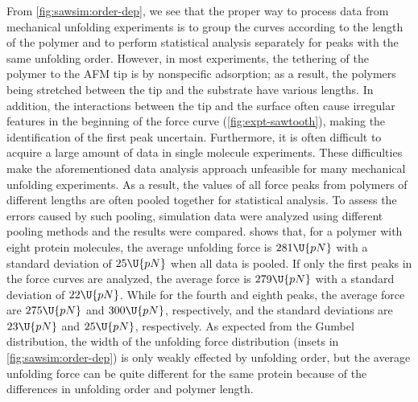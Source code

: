 From \cref{fig:sawsim:order-dep}, we see that the proper way to
process data from mechanical unfolding experiments is to group the
curves according to the length of the polymer and to perform
statistical analysis separately for peaks with the same unfolding
order.  However, in most experiments, the tethering of the polymer to
the AFM tip is by nonspecific adsorption; as a result, the polymers
being stretched between the tip and the substrate have various
lengths\citep{li00}.  In addition, the interactions between the tip
and the surface often cause irregular features in the beginning of the
force curve (\cref{fig:expt-sawtooth}), making the identification of
the first peak uncertain\citep{carrion-vazquez00}.  Furthermore, it is
often difficult to acquire a large amount of data in single molecule
experiments.  These difficulties make the aforementioned data analysis
approach unfeasible for many mechanical unfolding experiments.  As a
result, the values of all force peaks from polymers of different
lengths are often pooled together for statistical analysis.  To assess
the errors caused by such pooling, simulation data were analyzed using
different pooling methods and the results were compared.
 shows that, for a polymer with eight
protein molecules, the average unfolding force is $281\U{pN}$ with a
standard deviation of $25\U{pN}$ when all data is pooled.  If only the
first peaks in the force curves are analyzed, the average force is
$279\U{pN}$ with a standard deviation of $22\U{pN}$.  While for the
fourth and eighth peaks, the average force are $275\U{pN}$ and
$300\U{pN}$, respectively, and the standard deviations are $23\U{pN}$
and $25\U{pN}$, respectively.  As expected from the Gumbel
distribution, the width of the unfolding force distribution (insets in
\cref{fig:sawsim:order-dep}) is only weakly effected by unfolding
order, but the average unfolding force can be quite different for the
same protein because of the differences in unfolding order and polymer
length.

